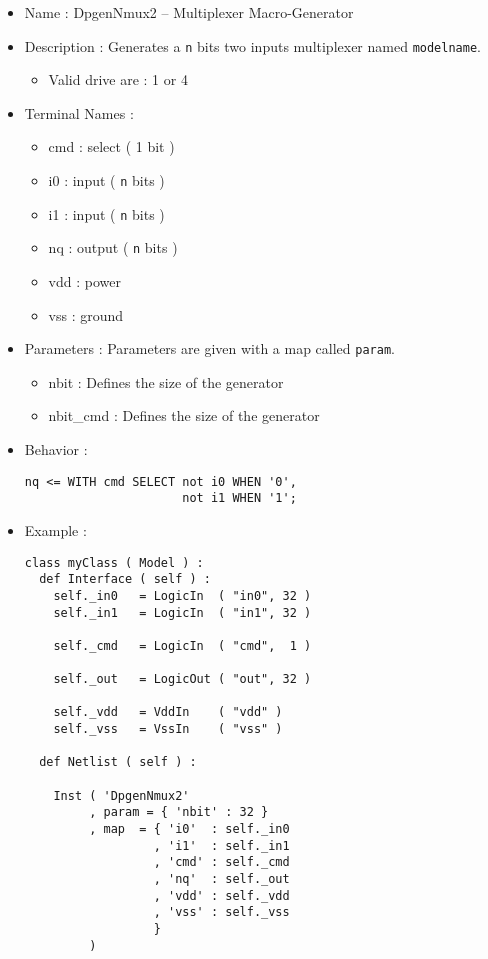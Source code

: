 \begin{itemize}
    \item Name : DpgenNmux2 -- Multiplexer Macro-Generator
    \item Description : Generates a \verb-n- bits two inputs multiplexer named \verb-modelname-.
    \begin{itemize}
        \item Valid drive are : 1 or 4
    \end{itemize}
    \item Terminal Names :
    \begin{itemize}
        \item cmd : select ( 1 bit )
        \item i0 : input ( \verb-n- bits )
        \item i1 : input ( \verb-n- bits )
        \item nq : output ( \verb-n- bits )
        \item vdd : power
        \item vss : ground
    \end{itemize}
    \item Parameters : Parameters are given with a map called \verb-param-.
    \begin{itemize}
        \item nbit : Defines the size of the generator
        \item nbit\_cmd : Defines the size of the generator
    \end{itemize}
    \item Behavior :
\begin{verbatim}
nq <= WITH cmd SELECT not i0 WHEN '0',
                      not i1 WHEN '1';
\end{verbatim}
    \item Example :
\begin{verbatim}
class myClass ( Model ) :
  def Interface ( self ) :
    self._in0   = LogicIn  ( "in0", 32 )
    self._in1   = LogicIn  ( "in1", 32 )
    
    self._cmd   = LogicIn  ( "cmd",  1 )
    
    self._out   = LogicOut ( "out", 32 )

    self._vdd   = VddIn    ( "vdd" )
    self._vss   = VssIn    ( "vss" )
    
  def Netlist ( self ) :
      
    Inst ( 'DpgenNmux2'
         , param = { 'nbit' : 32 }
         , map  = { 'i0'  : self._in0
                  , 'i1'  : self._in1
                  , 'cmd' : self._cmd
                  , 'nq'  : self._out
                  , 'vdd' : self._vdd
                  , 'vss' : self._vss
                  }
         )
\end{verbatim}
\end{itemize}
